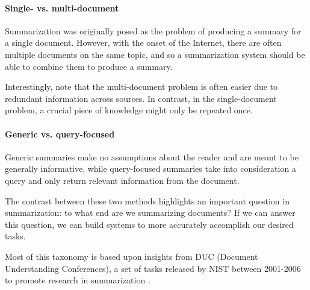 \documentclass[12pt]{report}
\begin{document}
\paragraph{Single- vs. multi-document} Summarization was originally posed as the problem of producing a summary for a single document. However, with the onset of the Internet, there are often multiple documents on the same topic, and so a summarization system should be able to combine them to produce a summary.

Interestingly, \citet{Nenkova2011} note that the multi-document problem is often easier due to redundant information across sources. In contrast, in the single-document problem, a crucial piece of knowledge might only be repeated once.



\paragraph{Generic vs. query-focused} Generic summaries make no assumptions about the reader and are meant to be generally informative, while query-focused summaries take into consideration a query and only return relevant information from the document.

The contrast between these two methods highlights an important question in summarization: to what end are we summarizing documents? If we can answer this question, we can build systems to more accurately accomplish our desired tasks.

\vspace{0.5cm}


Most of this taxonomy is based upon insights from DUC (Document Understanding Conferences), a set of tasks released by NIST between 2001-2006 to promote research in summarization \citep{over2007duc}.
\end{document}
